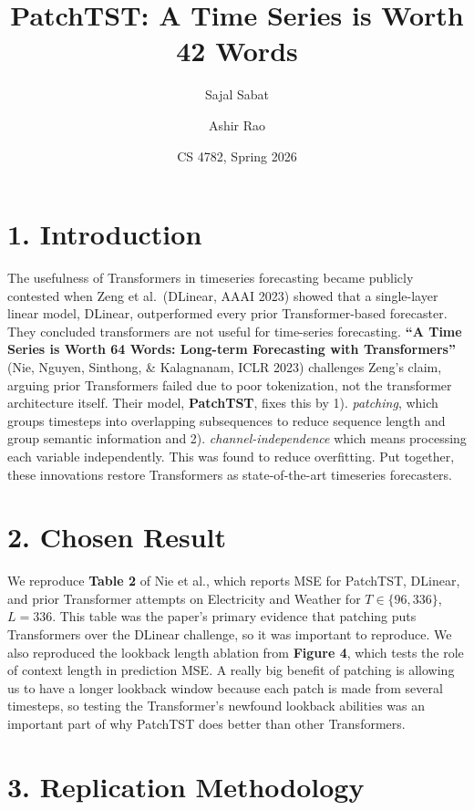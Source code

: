 \documentclass[11pt]{article}
\title{\vspace{-1.5em}\textbf{PatchTST: A Time Series is Worth 42 Words}\\}
\author{Sajal Sabat \and Ashir Rao}
\date{CS 4782, Spring 2026}
\begin{document}
\maketitle
\vspace{-1.5em}

\section*{1. Introduction}

The usefulness of Transformers in timeseries forecasting became publicly contested when Zeng et al.\ (DLinear, AAAI 2023) showed that a single-layer linear model, DLinear, outperformed every prior Transformer-based forecaster. They concluded transformers are not useful for time-series forecasting. \textbf{``A Time Series is Worth 64 Words: Long-term Forecasting with Transformers''} (Nie, Nguyen, Sinthong, \& Kalagnanam, ICLR 2023) challenges Zeng's claim, arguing prior Transformers failed due to poor tokenization, not the transformer architecture itself. Their model, \textbf{PatchTST}, fixes this by 1). \textit{patching}, which groups timesteps into overlapping subsequences to reduce sequence length and group semantic information and 2). \textit{channel-independence} which means processing each variable independently. This was found to reduce overfitting. Put together, these innovations restore Transformers as state-of-the-art timeseries forecasters.

\section*{2. Chosen Result}

We reproduce \textbf{Table 2} of Nie et al., which reports MSE for PatchTST, DLinear, and prior Transformer attempts on Electricity and Weather for $T \in \{96, 336\}$, $L=336$. This table was the paper's primary evidence that patching puts Transformers over the DLinear challenge, so it was important to reproduce. We also reproduced the lookback length ablation from \textbf{Figure 4}, which tests the role of context length in prediction MSE. A really big benefit of patching is allowing us to have a longer lookback window because each patch is made from several timesteps, so testing the Transformer's newfound lookback abilities was an important part of why PatchTST does better than other Transformers. 

\section*{3. Replication Methodology}
\end{document}
